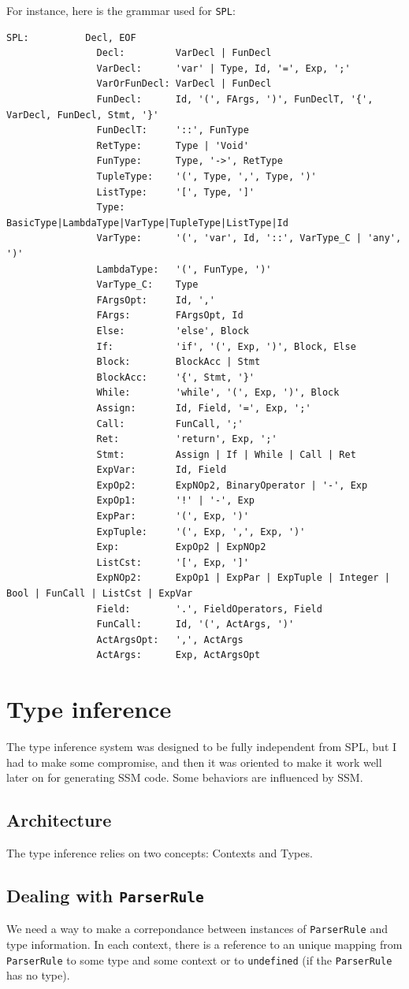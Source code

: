 \documentclass{article}
\newcommand\cc[1]{\lstinline{#1}}
\begin{document}
			For instance, here is the grammar used for \texttt{SPL}:
			\begin{lstlisting}[numbers=none]
			    SPL:          Decl, EOF
			    Decl:         VarDecl | FunDecl
			    VarDecl:      'var' | Type, Id, '=', Exp, ';'
			    VarOrFunDecl: VarDecl | FunDecl
			    FunDecl:      Id, '(', FArgs, ')', FunDeclT, '{', VarDecl, FunDecl, Stmt, '}'
			    FunDeclT:     '::', FunType
			    RetType:      Type | 'Void'
			    FunType:      Type, '->', RetType
			    TupleType:    '(', Type, ',', Type, ')'
			    ListType:     '[', Type, ']'
			    Type:         BasicType|LambdaType|VarType|TupleType|ListType|Id
			    VarType:      '(', 'var', Id, '::', VarType_C | 'any', ')'
			    LambdaType:   '(', FunType, ')'
			    VarType_C:    Type
			    FArgsOpt:     Id, ','
			    FArgs:        FArgsOpt, Id
			    Else:         'else', Block
			    If:           'if', '(', Exp, ')', Block, Else
			    Block:        BlockAcc | Stmt
			    BlockAcc:     '{', Stmt, '}'
			    While:        'while', '(', Exp, ')', Block
			    Assign:       Id, Field, '=', Exp, ';'
			    Call:         FunCall, ';'
			    Ret:          'return', Exp, ';'
			    Stmt:         Assign | If | While | Call | Ret
			    ExpVar:       Id, Field
			    ExpOp2:       ExpNOp2, BinaryOperator | '-', Exp
			    ExpOp1:       '!' | '-', Exp
			    ExpPar:       '(', Exp, ')'
			    ExpTuple:     '(', Exp, ',', Exp, ')'
			    Exp:          ExpOp2 | ExpNOp2
			    ListCst:      '[', Exp, ']'
			    ExpNOp2:      ExpOp1 | ExpPar | ExpTuple | Integer | Bool | FunCall | ListCst | ExpVar
			    Field:        '.', FieldOperators, Field
			    FunCall:      Id, '(', ActArgs, ')'
			    ActArgsOpt:   ',', ActArgs
			    ActArgs:      Exp, ActArgsOpt
			\end{lstlisting}
	\section{Type inference}
		The type inference system was designed to be fully independent from SPL, but I had to make some compromise, and then it was oriented to make it work well later on for generating SSM code. Some behaviors are influenced by SSM.

		\subsection{Architecture}
			The type inference relies on two concepts: Contexts and Types.

		\subsection{Dealing with \cc{ParserRule}}\label{dealingWithParserRule}
			We need a way to make a correpondance between instances of \cc{ParserRule} and type information. In each context, there is a reference to an unique mapping from \cc{ParserRule} to some type and some context or to \cc{undefined} (if the \cc{ParserRule} has no type).
\end{document}
